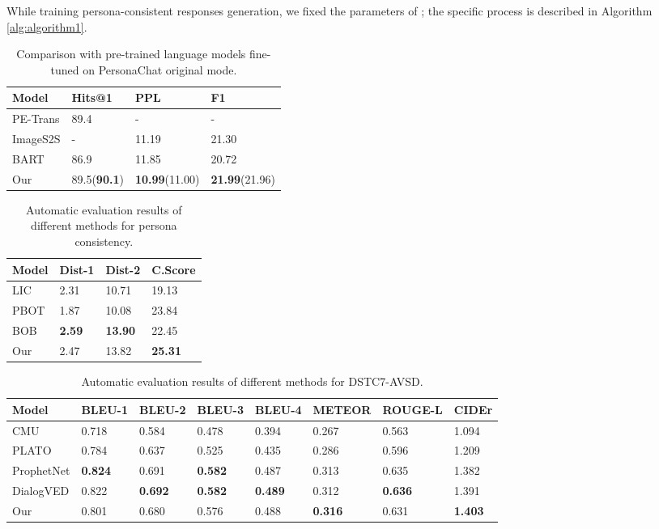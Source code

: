 \documentclass[letterpaper]{article} \usepackage{aaai23}  \usepackage{times}  \usepackage{helvet}  \usepackage{courier}  \usepackage[hyphens]{url}  \usepackage{graphicx} \urlstyle{rm} \def\UrlFont{\rm}  \usepackage{natbib}  \usepackage{caption} \frenchspacing  \setlength{\pdfpagewidth}{8.5in}  \setlength{\pdfpageheight}{11in}  \usepackage{algorithm}
\begin{document}
While training persona-consistent responses generation, we fixed the parameters of ; the specific process is described in Algorithm \ref{alg:algorithm1}.

\begin{table}[t]
  \centering
    \begin{tabular}{llll}
    \toprule
    Model & Hits@1 & PPL   & F1 \\
    \midrule
    PE-Trans & \multicolumn{1}{l}{89.4} & \multicolumn{1}{l}{-} & \multicolumn{1}{l}{-} \\
ImageS2S & \multicolumn{1}{l}{-} & \multicolumn{1}{l}{11.19} & \multicolumn{1}{l}{21.30} \\
BART  & \multicolumn{1}{l}{86.9} & \multicolumn{1}{l}{11.85} & \multicolumn{1}{l}{20.72} \\
Our   & 89.5(\textbf{90.1}) & \textbf{10.99}(11.00) & \textbf{21.99}(21.96) \\
    \bottomrule
    \end{tabular}\caption{Comparison with pre-trained language models fine-tuned on PersonaChat original mode.}
\label{table2}\end{table}\begin{table}[t]
  \centering
    \begin{tabular}{llll}
    \toprule
    Model & \multicolumn{1}{p{4.19em}}{Dist-1} & \multicolumn{1}{p{4.19em}}{Dist-2} & \multicolumn{1}{p{4.19em}}{C.Score} \\
    \midrule
    LIC   & 2.31  & 10.71 & 19.13 \\
PBOT & 1.87   & 10.08   &  23.84\\
BOB   & \textbf{2.59}      & \textbf{13.90}   &  22.45\\
Our   & 2.47  & 13.82 &  \textbf{25.31}\\
    \bottomrule
    \end{tabular}
\caption{Automatic evaluation results of different methods for persona consistency.}
\label{table3}
\end{table}
\begin{table*}[t]
  \centering
    \begin{tabular}{llllllll}
    \toprule
    Model & \multicolumn{1}{p{4.19em}}{BLEU-1} & \multicolumn{1}{p{4.19em}}{BLEU-2} & \multicolumn{1}{p{4.19em}}{BLEU-3} & \multicolumn{1}{p{4.19em}}{BLEU-4} & \multicolumn{1}{p{4.19em}}{METEOR} & \multicolumn{1}{p{4.49em}}{ROUGE-L} & \multicolumn{1}{p{4.19em}}{CIDEr} \\
    \midrule
    CMU   & 0.718 & 0.584 & 0.478 & 0.394 & 0.267 & 0.563 & 1.094 \\
PLATO & 0.784 & 0.637 & 0.525 & 0.435 & 0.286 & 0.596 & 1.209 \\
ProphetNet & \textbf{0.824} & 0.691 & \textbf{0.582} & 0.487 & 0.313 & 0.635 & 1.382 \\
DialogVED & 0.822 & \textbf{0.692} & \textbf{0.582} & \textbf{0.489} & 0.312 & \textbf{0.636} & 1.391 \\
Our   & 0.801 & 0.680  & 0.576 & 0.488 & \textbf{0.316} & 0.631 & \textbf{1.403} \\
    \bottomrule
    \end{tabular}
\caption{Automatic evaluation results of different methods for DSTC7-AVSD.}
\label{table4}
\end{table*}
\end{document}
